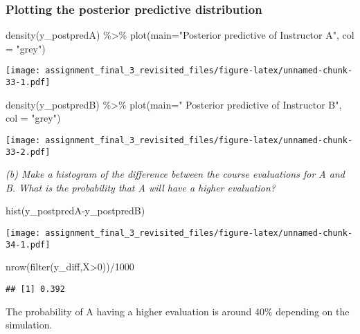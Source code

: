 \documentclass[
]{article}
\newenvironment{Shaded}{\begin{snugshade}}{\end{snugshade}}
\newcommand{\AttributeTok}[1]{\textcolor[rgb]{0.77,0.63,0.00}{#1}}
\newcommand{\DecValTok}[1]{\textcolor[rgb]{0.00,0.00,0.81}{#1}}
\newcommand{\FunctionTok}[1]{\textcolor[rgb]{0.00,0.00,0.00}{#1}}
\newcommand{\NormalTok}[1]{#1}
\newcommand{\SpecialCharTok}[1]{\textcolor[rgb]{0.00,0.00,0.00}{#1}}
\newcommand{\StringTok}[1]{\textcolor[rgb]{0.31,0.60,0.02}{#1}}
\begin{document}
\hypertarget{plotting-the-posterior-predictive-distribution}{%
\subsubsection{Plotting the posterior predictive
distribution}\label{plotting-the-posterior-predictive-distribution}}

\begin{Shaded}
\begin{Highlighting}[]
\FunctionTok{density}\NormalTok{(y\_postpredA) }\SpecialCharTok{\%\textgreater{}\%} \FunctionTok{plot}\NormalTok{(}\AttributeTok{main=}\StringTok{"Posterior predictive of Instructor A"}\NormalTok{, }\AttributeTok{col =} \StringTok{"grey"}\NormalTok{)}
\end{Highlighting}
\end{Shaded}

\texttt{[image: assignment\_final\_3\_revisited\_files/figure-latex/unnamed-chunk-33-1.pdf]}

\begin{Shaded}
\begin{Highlighting}[]
\FunctionTok{density}\NormalTok{(y\_postpredB) }\SpecialCharTok{\%\textgreater{}\%} \FunctionTok{plot}\NormalTok{(}\AttributeTok{main=}\StringTok{" Posterior predictive of Instructor B"}\NormalTok{, }\AttributeTok{col =} \StringTok{"grey"}\NormalTok{)}
\end{Highlighting}
\end{Shaded}

\texttt{[image: assignment\_final\_3\_revisited\_files/figure-latex/unnamed-chunk-33-2.pdf]}

\emph{(b) Make a histogram of the difference between the course
evaluations for A and B. What is the probability that A will have a
higher evaluation?}

\begin{Shaded}
\begin{Highlighting}[]
\FunctionTok{hist}\NormalTok{(y\_postpredA}\SpecialCharTok{{-}}\NormalTok{y\_postpredB)}
\end{Highlighting}
\end{Shaded}

\texttt{[image: assignment\_final\_3\_revisited\_files/figure-latex/unnamed-chunk-34-1.pdf]}

\begin{Shaded}
\begin{Highlighting}[]
\FunctionTok{nrow}\NormalTok{(}\FunctionTok{filter}\NormalTok{(y\_diff,X}\SpecialCharTok{\textgreater{}}\DecValTok{0}\NormalTok{))}\SpecialCharTok{/}\DecValTok{1000}
\end{Highlighting}
\end{Shaded}

\begin{verbatim}
## [1] 0.392
\end{verbatim}

The probability of A having a higher evaluation is around 40\% depending
on the simulation.
\end{document}
